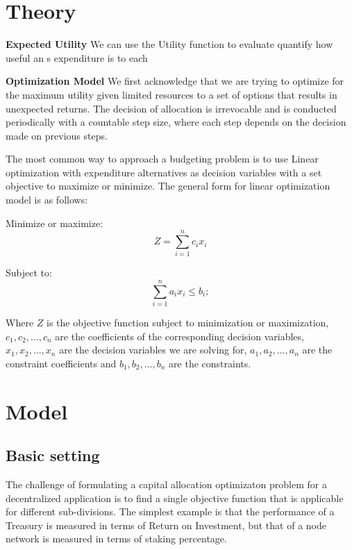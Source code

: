 \documentclass[conference,letterpaper]{IEEEtran}
\begin{document}
    \section{Theory}
        \textbf{Expected Utility}
        We can use the Utility function to evaluate quantify how useful an s expenditure is to each

        \textbf{Optimization Model}
        We first acknowledge that we are trying to optimize for the maximum utility given
        limited resources to a set of options that results in unexpected returns. The
        decision of allocation is irrevocable and is conducted periodically with a
        countable step size, where each step depends on the decision made on previous
        steps.

        The most common way to approach a budgeting problem is to use Linear optimization
        with expenditure alternatives as decision variables with a set objective to
        maximize or minimize. The general form for linear optimization model is as follows:

        Minimize or maximize:
        \begin{equation}
            Z = \sum_{i=1}^{n} c_i x_i
        \end{equation}

        Subject to:
        \begin{equation}
            \sum_{i=1}^{n} a_i x_i \le b_i;
        \end{equation}

        Where $Z$ is the objective function subject to minimization or maximization, $c_1,
        c_2, ..., c_n$ are the coefficients of the corresponding decision variables, $x_1,
        x_2, ..., x_n$ are the decision variables we are solving for, $a_1, a_2, ..., a_n$
        are the constraint coefficients and $b_1,b_2, ..., b_n$ are the constraints.

    \section{Model}
        \subsection{Basic setting}
            The challenge of formulating a capital allocation optimizaton problem for a
            decentralized application is to find a single objective function that is
            applicable for different sub-divisions. The simplest example is that the
            performance of a Treasury is measured in terms of Return on Investment, but
            that of a node network is measured in terms of staking percentage.
\end{document}
